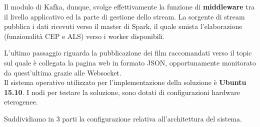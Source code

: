 \documentclass[12pt]{article}
\begin{document}
Il modulo di Kafka, dunque, svolge effettivamente la funzione di \textbf{middleware} tra il livello applicativo ed la parte di gestione dello stream. La sorgente di stream pubblica i dati ricevuti verso il master di Spark, il quale smista l'elaborazione (funzionalità CEP e ALS) verso i worker disponibili. 

L'ultimo passaggio riguarda la pubblicazione dei film raccomandati verso il topic sul quale è collegata la pagina web in formato JSON, opportunamente monitorato da quest'ultima grazie alle Websocket. \\


Il sistema operativo utilizzato per l'implementazione della soluzione è \textbf{Ubuntu 15.10}. I nodi per testare la soluzione, sono dotati di configurazioni hardware eterogenee.

Suddividiamo in 3 parti la configurazione relativa all'architettura del sistema.
\end{document}
